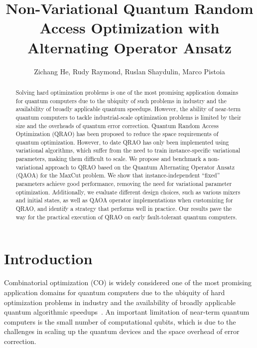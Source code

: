 \documentclass[conference,10pt]{IEEEtran}
\begin{document}

\title{Non-Variational Quantum Random Access Optimization with Alternating Operator Ansatz}

\author{Zichang He, Rudy Raymond, Ruslan Shaydulin, Marco Pistoia\\
}

\maketitle
\begin{abstract}
Solving hard optimization problems is one of the most promising application domains for quantum computers due to the ubiquity of such problems in industry and the availability of broadly applicable quantum speedups. However, the ability of near-term quantum computers to tackle industrial-scale optimization problems is limited by their size and the overheads of quantum error correction. Quantum Random Access Optimization (QRAO) has been proposed to reduce the space requirements of quantum optimization. However, to date QRAO has only been implemented using variational algorithms, which suffer from the need to train instance-specific variational parameters, making them difficult to scale. We propose and benchmark a non-variational approach to QRAO based on the Quantum Alternating Operator Ansatz (QAOA) for the MaxCut problem. We show that instance-independent ``fixed'' parameters achieve good performance, removing the need for variational parameter optimization. Additionally, we evaluate different design choices, such as various mixers and initial states, as well as QAOA operator implementations when customizing for QRAO, and identify a strategy that performs well in practice. Our results pave the way for the practical execution of QRAO on early fault-tolerant quantum computers.

\end{abstract}


\section{Introduction}
Combinatorial optimization (CO) is widely considered one of the most promising application domains for quantum computers due to the ubiquity of hard optimization problems in industry and the availability of broadly applicable quantum algorithmic speedups~\cite{quant-ph/9607014,Boulebnane2024,shaydulin2023evidence,Dalzell_2023,2410.23270,DAC24_review}. An important limitation of near-term quantum computers is the small number of computational qubits, which is due to the challenges in scaling up the quantum devices and the space overhead of error correction. 
\end{document}

